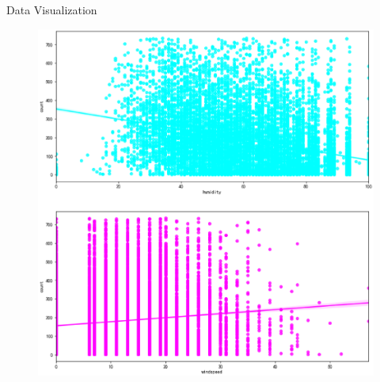 \documentclass[
 size=14pt,
 paper=smartboard,  %
 mode=present, 		%
 display=slides, 	%
 style=tuliplab,  	%
 pauseslide,
 fleqn,leqno]{powerdot}
\begin{document}
\begin{slide}[toc=,bm=]{Data  Visualization}
\begin{center}
{\begin{figure}
\begin{minipage}[t]{0.45\textwidth}
        \includegraphics[width=1\textwidth]{pic/three tahw2.eps}
        \end{minipage}
      \end{figure}   
    }
    \end{center}
 


\end{slide}
\end{document}
